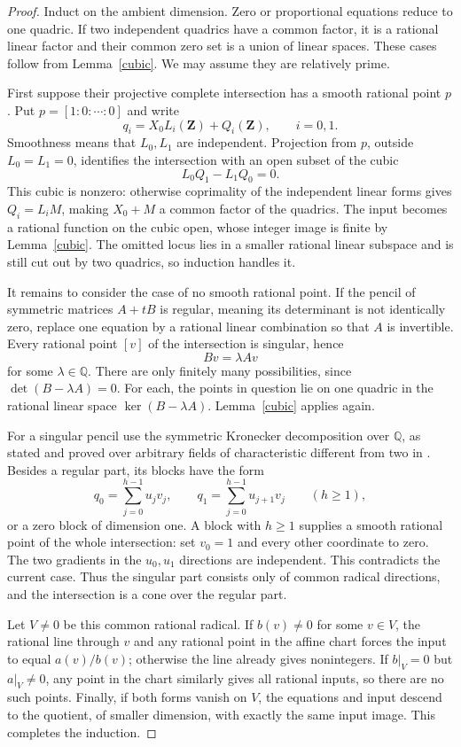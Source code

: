 \documentclass[11pt]{article}
\theoremstyle{remark}\newtheorem{remark}[theorem]{Remark}
\newcommand{\Q}{\mathbb Q}\newcommand{\Z}{\mathbb Z}\newcommand{\R}{\mathbb R}
\begin{document}
\begin{proof}
Induct on the ambient dimension. Zero or proportional equations reduce to one quadric. If two independent quadrics have a common factor, it is a rational linear factor and their common zero set is a union of linear spaces. These cases follow from Lemma~\ref{cubic}. We may assume they are relatively prime.

First suppose their projective complete intersection has a smooth rational point \(p\). Put \(p=[1:0:\cdots:0]\) and write
\[
 q_i=X_0L_i(\mathbf Z)+Q_i(\mathbf Z),\qquad i=0,1.
\]
Smoothness means that \(L_0,L_1\) are independent. Projection from \(p\), outside \(L_0=L_1=0\), identifies the intersection with an open subset of the cubic
\[
 L_0Q_1-L_1Q_0=0.
\]
This cubic is nonzero: otherwise coprimality of the independent linear forms gives \(Q_i=L_iM\), making \(X_0+M\) a common factor of the quadrics. The input becomes a rational function on the cubic open, whose integer image is finite by Lemma~\ref{cubic}. The omitted locus lies in a smaller rational linear subspace and is still cut out by two quadrics, so induction handles it.

It remains to consider the case of no smooth rational point. If the pencil of symmetric matrices \(A+tB\) is regular, meaning its determinant is not identically zero, replace one equation by a rational linear combination so that \(A\) is invertible. Every rational point \([v]\) of the intersection is singular, hence
\[
 Bv=\lambda Av
\]
for some \(\lambda\in\Q\). There are only finitely many possibilities, since \(\det(B-\lambda A)=0\). For each, the points in question lie on one quadric in the rational linear space \(\ker(B-\lambda A)\). Lemma~\ref{cubic} applies again.

For a singular pencil use the symmetric Kronecker decomposition over \(\Q\), as stated and proved over arbitrary fields of characteristic different from two in \cite[Propositions 1.10 and 1.13]{PFR}. Besides a regular part, its blocks have the form
\[
 q_0=\sum_{j=0}^{h-1}u_jv_j,\qquad
 q_1=\sum_{j=0}^{h-1}u_{j+1}v_j\qquad(h\ge1),
\]
or a zero block of dimension one. A block with \(h\ge1\) supplies a smooth rational point of the whole intersection: set \(v_0=1\) and every other coordinate to zero. The two gradients in the \(u_0,u_1\) directions are independent. This contradicts the current case. Thus the singular part consists only of common radical directions, and the intersection is a cone over the regular part.

Let \(V\ne0\) be this common rational radical. If \(b(v)\ne0\) for some \(v\in V\), the rational line through \(v\) and any rational point in the affine chart forces the input to equal \(a(v)/b(v)\); otherwise the line already gives nonintegers. If \(b|_V=0\) but \(a|_V\ne0\), any point in the chart similarly gives all rational inputs, so there are no such points. Finally, if both forms vanish on \(V\), the equations and input descend to the quotient, of smaller dimension, with exactly the same input image. This completes the induction.
\end{proof}
\end{document}
